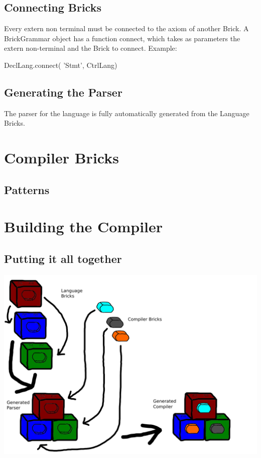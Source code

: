 \documentclass[11pt,fleqn]{book} %
\begin{document}
\section{Connecting Bricks}
Every extern non terminal must be connected to the axiom of another Brick. A BrickGrammar object has a function connect, which takes as parameters the extern non-terminal and the Brick to connect. Example:

\begin{theorem}
DeclLang.connect(       'Stmt',    CtrlLang)
\end{theorem}


\section{Generating the Parser}
The parser for the language is fully automatically generated from the Language Bricks.

\chapter{Compiler Bricks}
\section{Patterns}

\chapter{Building the Compiler}
\section{Putting it all together}
\begin{center}
 \includegraphics[scale=0.6]{Pictures/compiler}
\end{center}
\end{document}

